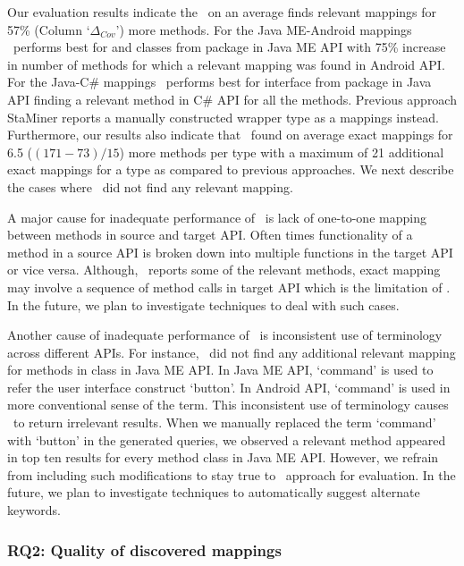 Our evaluation results indicate the \tool\ on an average finds relevant mappings for 57\% (Column `$\Delta_{Cov}$') more methods. 
For the Java ME-Android mappings \tool\ performs best for 
and  classes from  
package in Java ME API with 75\% increase in number of methods
for which a relevant mapping was found in Android API.
For the Java-C\# mappings \tool\ performs best for  interface from  package in Java API
finding a relevant method in C\# API for all the methods.
Previous approach StaMiner reports a manually constructed wrapper type as a mappings instead.
Furthermore, our results also indicate that \tool\ found on average exact mappings for 6.5 ($(171-73)/15$) more methods per type with a maximum of 21 additional exact mappings for a  type as compared to previous approaches.
We next describe the cases where \tool\ did not find any relevant mapping.

A major cause for inadequate performance of \tool\ is 
lack of one-to-one mapping between methods in source and target API.
Often times functionality of a method in a source API 
is broken down into multiple functions in the target API or vice versa.
Although, \tool\ reports some of the relevant methods, exact mapping may involve a sequence of method calls in target API which is the limitation of \tool.
In the future, we plan to investigate techniques to deal with such cases.


Another cause of inadequate performance of \tool\ is 
inconsistent use of terminology across different APIs.
For instance, \tool\ did not find any additional relevant mapping for methods in  class in Java ME API.
In Java ME API, `command' is used to refer the user interface construct `button'.
In Android API, `command' is used in more conventional sense of the term.
This inconsistent use of terminology causes \tool\ to return irrelevant results. 
When we manually replaced the term `command' with `button' in the generated queries,
we observed a relevant method appeared in top ten results for every method  class in Java ME API.
However, we refrain from including such modifications to stay true to \tool\ approach for evaluation.
In the future, we plan to investigate techniques to automatically suggest alternate keywords.


\subsubsection{RQ2: Quality of discovered mappings}

